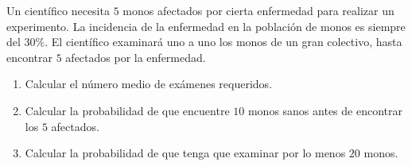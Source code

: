 \begin{ejercicio}
    Un científico necesita $5$ monos afectados por cierta enfermedad para realizar un experimento. La
    incidencia de la enfermedad en la población de monos es siempre del $30\%$. El científico examinará
    uno a uno los monos de un gran colectivo, hasta encontrar $5$ afectados por la enfermedad.
    \begin{enumerate}
        \item Calcular el número medio de exámenes requeridos.
        \item Calcular la probabilidad de que encuentre $10$ monos sanos antes de encontrar los $5$ afectados.
        \item Calcular la probabilidad de que tenga que examinar por lo menos $20$ monos.
    \end{enumerate}
\end{ejercicio}

